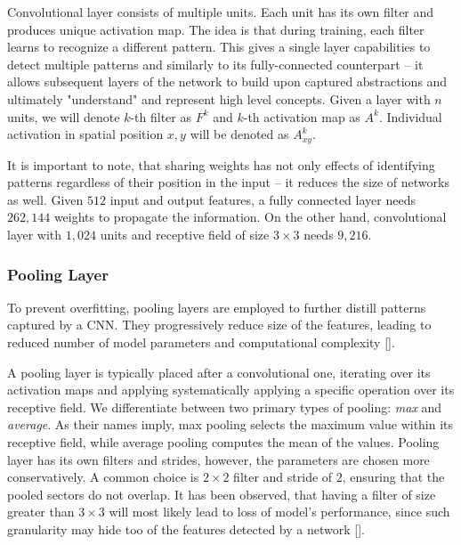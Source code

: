 Convolutional layer consists of multiple units. Each unit has its own filter and produces unique activation map. The idea is that during training, each filter learns to recognize a different pattern. This gives a single layer capabilities to detect multiple patterns and similarly to its fully-connected counterpart -- it allows subsequent layers of the network to build upon captured abstractions and ultimately "understand" and represent high level concepts. Given a layer with $n$ units, we will denote $k$-th filter as $F^k$ and $k$-th activation map as $A^k$. Individual activation in spatial position $x, y$ will be denoted as $A^k_{xy}$.

It is important to note, that sharing weights has not only effects of identifying patterns regardless of their position in the input -- it reduces the size of networks as well. Given $512$ input and output features, a fully connected layer needs $262,144$ weights to propagate the information. On the other hand, convolutional layer with $1,024$ units and receptive field of size $3 \times 3$ needs $9,216$.

\subsubsection{Pooling Layer}

To prevent overfitting, pooling layers are employed to further distill patterns captured by a CNN. They progressively reduce size of the features, leading to reduced number of model parameters and computational complexity [].

A pooling layer is typically placed after a convolutional one, iterating over its activation maps and applying systematically applying a specific operation over its receptive field. We differentiate between two primary types of pooling: \emph{max} and \emph{average}. As their names imply, max pooling selects the maximum value within its receptive field, while average pooling computes the mean of the values. Pooling layer has its own filters and strides, however, the parameters are chosen more conservatively. A common choice is $2 \times 2$ filter and stride of $2$, ensuring that the pooled sectors do not overlap. It has been observed, that having a filter of size greater than $3 \times 3$ will most likely lead to loss of model's performance, since such granularity may hide too of the features detected by a network [].

